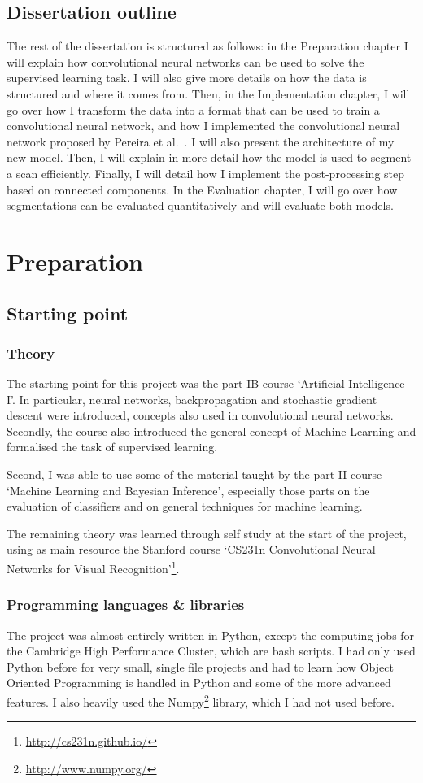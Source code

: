 \documentclass[12pt,a4paper,twoside,openright]{report}
\begin{document}
\section{Dissertation outline}
The rest of the dissertation is structured as follows: in the Preparation chapter I will explain how convolutional neural networks can be used to solve the supervised learning task. I will also give more details on how the data is structured and where it comes from. Then, in the Implementation chapter, I will go over how I transform the data into a format that can be used to train a convolutional neural network, and how I implemented the convolutional neural network proposed by Pereira et al.\ \cite{pereira}. I will also present the architecture of my new model. Then, I will explain in more detail how the model is used to segment a scan efficiently. Finally, I will detail how I implement the post-processing step based on connected components. In the Evaluation chapter, I will go over how segmentations can be evaluated quantitatively and will evaluate both models.

\chapter{Preparation}

\section{Starting point}
\subsection{Theory}
The starting point for this project was the part IB course `Artificial Intelligence I'. In particular, neural networks, backpropagation and stochastic gradient descent were introduced, concepts also used in convolutional neural networks. Secondly, the course also introduced the general concept of Machine Learning and formalised the task of supervised learning.

Second, I was able to use some of the material taught by the part II course `Machine Learning and Bayesian Inference', especially those parts on the evaluation of classifiers and on general techniques for machine learning.

The remaining theory was learned through self study at the start of the project, using as main resource the Stanford course `CS231n Convolutional Neural Networks for Visual Recognition'\footnote{\url{http://cs231n.github.io/}}.
\subsection{Programming languages \& libraries}
The project was almost entirely written in Python, except the computing jobs for the Cambridge High Performance Cluster, which are bash scripts. I had only used Python before for very small, single file projects and had to learn how Object Oriented Programming is handled in Python and some of the more advanced features. I also heavily used the Numpy\footnote{\url{http://www.numpy.org/}} library, which I had not used before.
\end{document}
